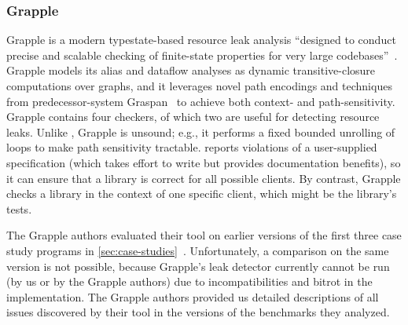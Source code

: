 

\subsubsection{Grapple}
\label{sec:grapple}

Grapple is a modern typestate-based resource leak analysis
``designed to conduct precise and scalable checking of finite-state properties for very
large codebases''~\cite{zuo2019grapple}. Grapple models its alias and
dataflow analyses as dynamic transitive-closure computations over graphs, and
it leverages novel path encodings and techniques from predecessor-system
Graspan~\cite{wang2017graspan} to achieve both context- and path-sensitivity.  
Grapple contains four checkers, of which two are useful for detecting
resource leaks.  Unlike \tool, Grapple is unsound; e.g., it performs a fixed bounded unrolling
of loops to make path sensitivity tractable.
\Tool reports violations of a user-supplied specification
(which takes effort to write but provides documentation benefits), so it
can ensure that a library is correct for all possible clients.  By
contrast, Grapple checks a library in the context of one specific client,
which might be the library's tests.

The Grapple authors evaluated their tool on earlier versions of the first three
case study programs in \cref{sec:case-studies}~\cite{zuo2019grapple}.
Unfortunately, a comparison on the same version is not possible, because
Grapple's leak detector currently cannot be run
(by us or by the Grapple authors)
due to
incompatibilities and bitrot in the implementation.
The Grapple authors provided us
detailed descriptions of all issues discovered by their tool in the
versions of the benchmarks they analyzed.

